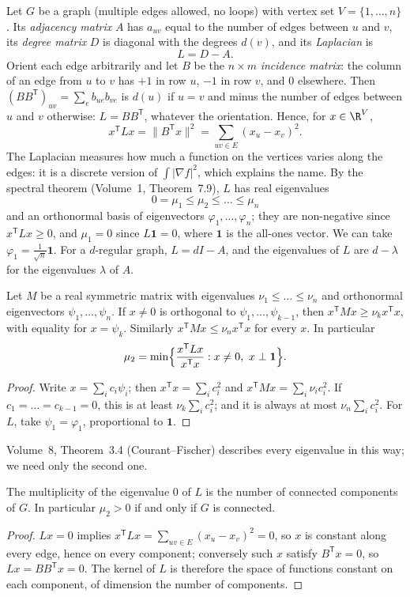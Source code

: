 Let $G$ be a graph (multiple edges allowed, no loops) with vertex set $V=\{1,\dots,n\}$. Its \emph{adjacency matrix} $A$ has $a_{uv}$ equal to the
number of edges between $u$ and $v$, its \emph{degree matrix} $D$ is diagonal with the degrees $d(v)$, and its \emph{Laplacian} is
\[
L=D-A.
\]
Orient each edge arbitrarily and let $B$ be the $n\times m$ \emph{incidence matrix}: the column of an edge from $u$ to $v$ has $+1$ in row $u$, $-1$ in
row $v$, and $0$ elsewhere. Then $(BB^{\mathsf T})_{uv}=\sum_eb_{ue}b_{ve}$ is $d(u)$ if $u=v$ and minus the number of edges between $u$ and $v$ otherwise:
$L=BB^{\mathsf T}$, whatever the orientation. Hence, for $x\in\R^V$,
\[
x^{\mathsf T}Lx=\|B^{\mathsf T}x\|^2=\sum_{uv\in E}(x_u-x_v)^2.
\]
The Laplacian measures how much a function on the vertices varies along the edges: it is a discrete version of $\int|\nabla f|^2$, which
explains the name. By the spectral theorem (Volume~1, Theorem~7.9), $L$ has real eigenvalues
\[
0=\mu_1\le\mu_2\le\dots\le\mu_n
\]
and an orthonormal basis of eigenvectors $\varphi_1,\dots,\varphi_n$; they are non-negative since $x^{\mathsf T}Lx\ge0$, and $\mu_1=0$ since $L\mathbf1=0$, where $\mathbf1$ is the all-ones
vector. We can take $\varphi_1=\frac1{\sqrt n}\mathbf1$. For a $d$-regular graph, $L=dI-A$, and the eigenvalues of $L$ are $d-\lambda$ for the eigenvalues $\lambda$ of $A$.

\begin{lemma}[Rayleigh]\label{spectral:lem:rayleigh}
Let $M$ be a real symmetric matrix with eigenvalues $\nu_1\le\dots\le\nu_n$ and orthonormal eigenvectors $\psi_1,\dots,\psi_n$. If $x\ne0$ is orthogonal to
$\psi_1,\dots,\psi_{k-1}$, then $x^{\mathsf T}Mx\ge\nu_kx^{\mathsf T}x$, with equality for $x=\psi_k$. Similarly $x^{\mathsf T}Mx\le\nu_nx^{\mathsf T}x$ for every $x$. In particular
\[
\mu_2=\min\Bigl\{\frac{x^{\mathsf T}Lx}{x^{\mathsf T}x}:x\ne0,\ x\perp\mathbf1\Bigr\}.
\]
\end{lemma}
\begin{proof}
Write $x=\sum_ic_i\psi_i$; then $x^{\mathsf T}x=\sum_ic_i^2$ and $x^{\mathsf T}Mx=\sum_i\nu_ic_i^2$. If $c_1=\dots=c_{k-1}=0$, this is at least $\nu_k\sum_ic_i^2$; and it is always at most
$\nu_n\sum_ic_i^2$. For $L$, take $\psi_1=\varphi_1$, proportional to $\mathbf1$.
\end{proof}

Volume~8, Theorem~3.4 (Courant--Fischer) describes every eigenvalue in this way; we need only the second one.

\begin{proposition}\label{spectral:prop:components}
The multiplicity of the eigenvalue $0$ of $L$ is the number of connected components of $G$. In particular $\mu_2>0$ if and only if $G$ is connected.
\end{proposition}
\begin{proof}
$Lx=0$ implies $x^{\mathsf T}Lx=\sum_{uv\in E}(x_u-x_v)^2=0$, so $x$ is constant along every edge, hence on every component; conversely such $x$ satisfy $B^{\mathsf T}x=0$,
so $Lx=BB^{\mathsf T}x=0$. The kernel of $L$ is therefore the space of functions constant on each component, of dimension the number of components.
\end{proof}

